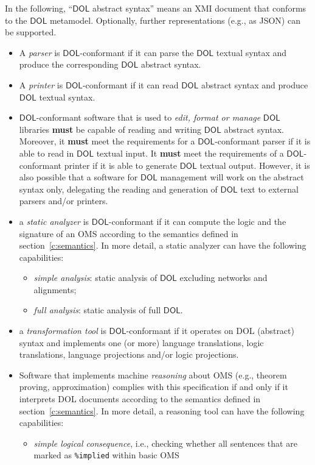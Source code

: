 \documentclass[10pt, a4paper]{isov2}
\newcommand*{\syntax}[1]{\texttt{#1}}
\newcommand*{\hasto}{\textbf{must}\xspace}
\newcommand*{\DOL}{\ensuremath{\mathsf{DOL}}\xspace}
\begin{document}
In the following, ``\DOL abstract syntax'' means an XMI document that
conforms to the \DOL metamodel. Optionally, further representations
(e.g., as JSON) can be supported.
\begin{itemize}
\item
A \emph{parser} is \DOL-conformant if it can parse the \DOL textual syntax and produce the corresponding \DOL abstract syntax.
\item
A \emph{printer} is \DOL-conformant if it can read \DOL abstract syntax and produce \DOL textual syntax.
\item
{\DOL}-conformant software that is used to \emph{edit, format or manage} \DOL libraries \hasto be capable of reading and writing \DOL abstract syntax. Moreover, it \hasto meet the requirements for a \DOL-conformant parser if it is able to read in \DOL textual input. It \hasto meet the requirements of a \DOL-conformant printer if it is able to generate \DOL textual output. However, it is also possible that a software for \DOL management will work on the abstract syntax only, delegating the reading and generation of \DOL text to external parsers and/or printers.
\item a \emph{static analyzer} is \DOL-conformant if it can compute
  the logic and the signature of an OMS according to the semantics
  defined in section~\ref{c:semantics}. In more detail, a static analyzer
  can have the following capabilities:
\begin{itemize}
\item \emph{simple analysis}: static analysis of \DOL excluding networks and alignments;
\item \emph{full analysis}: static analysis of full \DOL.
\end{itemize}
\item a \emph{transformation tool} is \DOL-conformant if it operates on DOL (abstract) syntax and implements
one (or more) language translations, logic translations, language
projections and/or logic projections.
\item
Software that implements machine \emph{reasoning} about OMS (e.g., theorem proving, approximation)  complies with this specification if and only if it interprets  DOL documents according to the semantics defined in section~\ref{c:semantics}. In more detail, a reasoning tool can have the following capabilities:
\begin{itemize}
\item \emph{simple logical consequence}, i.e., checking whether all sentences that are marked as \syntax{\%implied} within basic OMS

\end{itemize}
\end{itemize}
\end{document}
